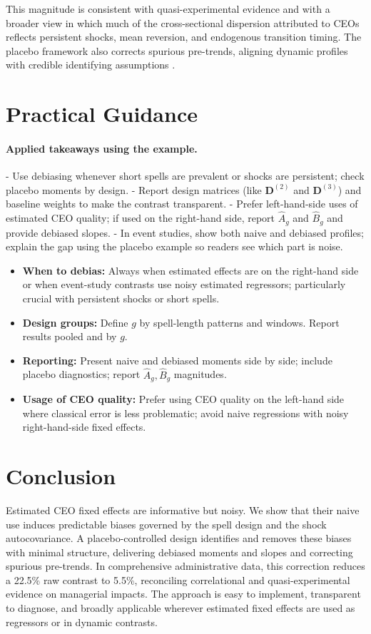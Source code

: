 \documentclass[11pt,a4paper]{article}
\begin{document}
This magnitude is consistent with quasi-experimental evidence \citep{bennedsen2020ceos} and with a broader view in which much of the cross-sectional dispersion attributed to CEOs reflects persistent shocks, mean reversion, and endogenous transition timing. The placebo framework also corrects spurious pre-trends, aligning dynamic profiles with credible identifying assumptions \citep{Callaway2021JoLE}.

\section{Practical Guidance}
\paragraph{Applied takeaways using the example.}
- Use debiasing whenever short spells are prevalent or shocks are persistent; check placebo moments by design.
- Report design matrices (like $\mathbf D^{(2)}$ and $\mathbf D^{(3)}$) and baseline weights to make the contrast transparent.
- Prefer left-hand-side uses of estimated CEO quality; if used on the right-hand side, report $\hat A_g$ and $\hat B_g$ and provide debiased slopes.
- In event studies, show both naive and debiased profiles; explain the gap using the placebo example so readers see which part is noise.
\begin{itemize}
  \item \textbf{When to debias:} Always when estimated effects are on the right-hand side or when event-study contrasts use noisy estimated regressors; particularly crucial with persistent shocks or short spells.
  \item \textbf{Design groups:} Define $g$ by spell-length patterns and windows. Report results pooled and by $g$.
  \item \textbf{Reporting:} Present naive and debiased moments side by side; include placebo diagnostics; report $\hat A_g,\hat B_g$ magnitudes.
  \item \textbf{Usage of CEO quality:} Prefer using CEO quality on the left-hand side where classical error is less problematic; avoid naive regressions with noisy right-hand-side fixed effects.
\end{itemize}

\section{Conclusion}
Estimated CEO fixed effects are informative but noisy. We show that their naive use induces predictable biases governed by the spell design and the shock autocovariance. A placebo-controlled design identifies and removes these biases with minimal structure, delivering debiased moments and slopes and correcting spurious pre-trends. In comprehensive administrative data, this correction reduces a 22.5\% raw contrast to 5.5\%, reconciling correlational and quasi-experimental evidence on managerial impacts. The approach is easy to implement, transparent to diagnose, and broadly applicable wherever estimated fixed effects are used as regressors or in dynamic contrasts.



\end{document}
